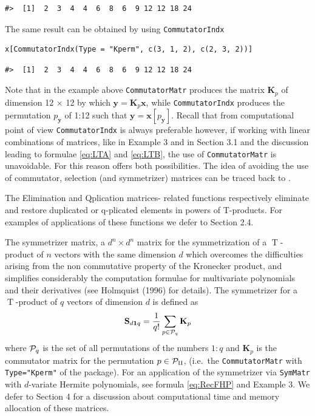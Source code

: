 \begin{verbatim}
#>  [1]  2  3  4  4  6  8  6  9 12 12 18 24
\end{verbatim}

The same result can be obtained by using \texttt{CommutatorIndx}

\begin{verbatim}
x[CommutatorIndx(Type = "Kperm", c(3, 1, 2), c(2, 3, 2))]
\end{verbatim}

\begin{verbatim}
#>  [1]  2  3  4  4  6  8  6  9 12 12 18 24
\end{verbatim}

Note that in the example above \texttt{CommutatorMatr} produces the matrix \(\mathbf{K}_{{p}}\) of dimension 12 \(\times\) 12 by which \(\mathbf{y}=\mathbf{K}_{{p}} \mathbf{x}\), while \texttt{CommutatorIndx} produces the permutation \({p}_{\mathbf{y}}\) of 1:12 such that \(\mathbf{y}=\mathbf{x}[{p}_{\mathbf{y}}]\).
Recall that from computational point of view \texttt{CommutatorIndx} is always preferable however, if working with linear combinations of matrices, like in Example 3 and in Section 3.1 and the discussion leading to formulae \eqref{eq:LTA} and \eqref{eq:LTB}, the use of \texttt{CommutatorMatr} is unavoidable. For this reason  offers both possibilities. The idea of avoiding the use of commutator, selection (and symmetrizer) matrices can be traced back to \citet{Chacon2014}.

The Elimination and Qplication matrices- related functions respectively eliminate and restore duplicated or q-plicated elements in powers of T-products. For examples of applications of these functions we defer to Section 2.4.

The symmetrizer matrix, a \(d^n \times d^n\) matrix for the symmetrization of a \(\operatorname{T}\)-product of \(n\) vectors with the same dimension \(d\) which overcomes the difficulties arising from the non commutative property of the Kronecker product, and simplifies considerably the computation formulae for multivariate polynomials and their derivatives (see Holmquist (1996) for details). The symmetrizer for a \(\operatorname{T}\)-product of \(q\) vectors of dimension \(d\) is defined as
\begin{equation}
\mathbf{S}_{d \mathbf{1}q}=\frac{1}{q!} \sum_{p \in {\cal{P}}_q} \mathbf{K}_p
\label{eq:DefSym}
\end{equation}
where \({\cal{P}}_q\) is the set of all permutations of the numbers \(1:q\) and \(\mathbf{K}_p\) is the commutator matrix for the permutation \(p \in \cal{P}_q\), (i.e.~the \texttt{CommutatorMatr} with \texttt{Type="Kperm"} of the package). For an application of the symmetrizer via \texttt{SymMatr} with \(d\)-variate Hermite polynomials, see formula \eqref{eq:RecFHP} and Example 3. We defer to Section 4 for a discussion about computational time and memory allocation of these matrices.

